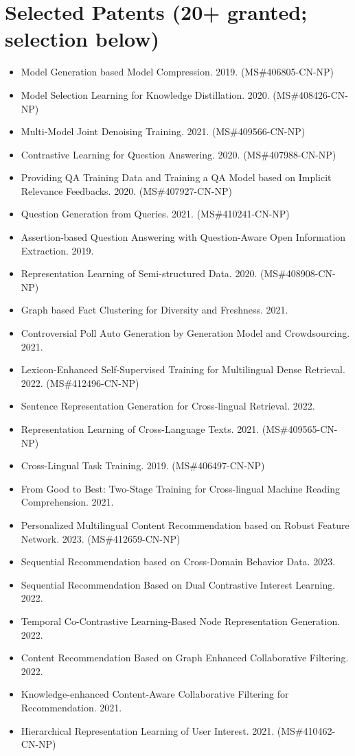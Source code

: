 \documentclass[10.5pt,letterpaper]{article}
\begin{document}
\section*{Selected Patents (20+ granted; selection below)}
\begin{itemize}[leftmargin=1.1em, itemsep=0pt, topsep=1pt, parsep=0pt]
  \item Model Generation based Model Compression. 2019. (MS\#406805-CN-NP)
  \item Model Selection Learning for Knowledge Distillation. 2020. (MS\#408426-CN-NP)
  \item Multi-Model Joint Denoising Training. 2021. (MS\#409566-CN-NP)
  \item Contrastive Learning for Question Answering. 2020. (MS\#407988-CN-NP)
  \item Providing QA Training Data and Training a QA Model based on Implicit Relevance Feedbacks. 2020. (MS\#407927-CN-NP)
  \item Question Generation from Queries. 2021. (MS\#410241-CN-NP)
  \item Assertion-based Question Answering with Question-Aware Open Information Extraction. 2019.
  \item Representation Learning of Semi-structured Data. 2020. (MS\#408908-CN-NP)
  \item Graph based Fact Clustering for Diversity and Freshness. 2021.
  \item Controversial Poll Auto Generation by Generation Model and Crowdsourcing. 2021.
  \item Lexicon-Enhanced Self-Supervised Training for Multilingual Dense Retrieval. 2022. (MS\#412496-CN-NP)
  \item Sentence Representation Generation for Cross-lingual Retrieval. 2022.
  \item Representation Learning of Cross-Language Texts. 2021. (MS\#409565-CN-NP)
  \item Cross-Lingual Task Training. 2019. (MS\#406497-CN-NP)
  \item From Good to Best: Two-Stage Training for Cross-lingual Machine Reading Comprehension. 2021.
  \item Personalized Multilingual Content Recommendation based on Robust Feature Network. 2023. (MS\#412659-CN-NP)
  \item Sequential Recommendation based on Cross-Domain Behavior Data. 2023.
  \item Sequential Recommendation Based on Dual Contrastive Interest Learning. 2022.
  \item Temporal Co-Contrastive Learning-Based Node Representation Generation. 2022.
  \item Content Recommendation Based on Graph Enhanced Collaborative Filtering. 2022.
  \item Knowledge-enhanced Content-Aware Collaborative Filtering for Recommendation. 2021.
  \item Hierarchical Representation Learning of User Interest. 2021. (MS\#410462-CN-NP)
\end{itemize}
\end{document}
